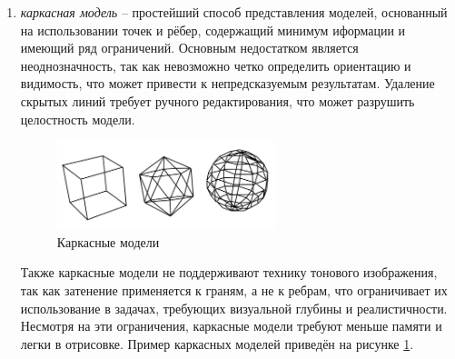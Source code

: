 \begin{enumerate}
	\item \textit{каркасная модель} -- простейший способ представления моделей, основанный на использовании точек и рёбер, содержащий минимум иформации и имеющий ряд ограничений. Основным недостатком является неоднозначность, так как невозможно четко определить ориентацию и видимость, что может привести к непредсказуемым результатам. Удаление скрытых линий требует ручного редактирования, что может разрушить целостность модели. 
	\begin{figure}[h] 
		\centering
		\includegraphics[width=0.6\textwidth]{images/carcass-models.png}
		\caption{Каркасные модели} 
		\label{fig:carcass-models} 
	\end{figure}
	Также каркасные модели не поддерживают технику тонового изображения, так как затенение применяется к граням, а не к ребрам, что ограничивает их использование в задачах, требующих визуальной глубины и реалистичности. Несмотря на эти ограничения, каркасные модели требуют меньше памяти и легки в отрисовке. Пример каркасных моделей приведён на рисунке \ref{fig:carcass-models}.
	

\end{enumerate}
